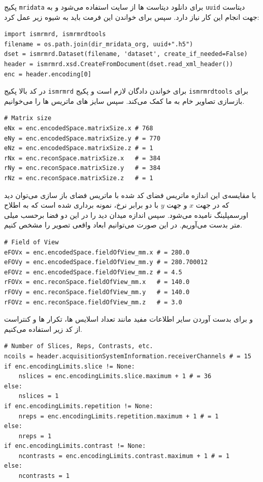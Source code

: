 پکیج \texttt{mridata}
برای دانلود دیتاست ها از سایت 
استفاده می‌شود و به \texttt{uuid}
دیتاست جهت انجام این کار نیاز دارد.
سپس برای خواندن این فرمت باید به شیوه زیر عمل کرد:

\begin{latin}
\begin{lstlisting}
import ismrmrd, ismrmrdtools
filename = os.path.join(dir_mridata_org, uuid+".h5")
dset = ismrmrd.Dataset(filename, 'dataset', create_if_needed=False)
header = ismrmrd.xsd.CreateFromDocument(dset.read_xml_header())
enc = header.encoding[0]
\end{lstlisting}
\end{latin}

در کد بالا پکیج \texttt{ismrmrd}
برای خواندن دادگان لازم است و پکیج \texttt{ismrmrdtools}
برای بازسازی تصاویر خام به ما کمک می‌کند. سپس سایز های ماتریس ها را می‌خوانیم.


\begin{latin}
\begin{lstlisting}
# Matrix size
eNx = enc.encodedSpace.matrixSize.x # 768
eNy = enc.encodedSpace.matrixSize.y # = 770
eNz = enc.encodedSpace.matrixSize.z # = 1
rNx = enc.reconSpace.matrixSize.x   # = 384
rNy = enc.reconSpace.matrixSize.y   # = 384
rNz = enc.reconSpace.matrixSize.z   # = 1
\end{lstlisting}
\end{latin}

با مقایسه‌ی این اندازه ماتریس فضای کد شده با ماتریس فضای باز سازی می‌توان دید که در جهت $x$ و جهت $y$ با دو برابر نرخ، نمونه برداری شده است که به اطلاح اورسمپلینگ 
نامیده می‌شود.	سپس اندازه میدان دید را در این دو فضا برحسب میلی متر بدست می‌آوریم. در این صورت می‌توانیم ابعاد واقعی تصویر را مشخص کنیم.

\begin{latin}
\begin{lstlisting}
# Field of View 
eFOVx = enc.encodedSpace.fieldOfView_mm.x # = 280.0
eFOVy = enc.encodedSpace.fieldOfView_mm.y # = 280.700012
eFOVz = enc.encodedSpace.fieldOfView_mm.z # = 4.5
rFOVx = enc.reconSpace.fieldOfView_mm.x   # = 140.0 
rFOVy = enc.reconSpace.fieldOfView_mm.y   # = 140.0
rFOVz = enc.reconSpace.fieldOfView_mm.z   # = 3.0
\end{lstlisting}
\end{latin}
و برای بدست آوردن سایر اطلاعات مفید مانند تعداد اسلایس ها، تکرار ها و کنتراست از کد زیر استفاده می‌کنیم.

\begin{latin}
\begin{lstlisting}
# Number of Slices, Reps, Contrasts, etc.
ncoils = header.acquisitionSystemInformation.receiverChannels # = 15
if enc.encodingLimits.slice != None:
	nslices = enc.encodingLimits.slice.maximum + 1 # = 36
else:
	nslices = 1
if enc.encodingLimits.repetition != None:
	nreps = enc.encodingLimits.repetition.maximum + 1 # = 1
else:
	nreps = 1
if enc.encodingLimits.contrast != None:
	ncontrasts = enc.encodingLimits.contrast.maximum + 1 # = 1
else:
	ncontrasts = 1
\end{lstlisting}
\end{latin}

